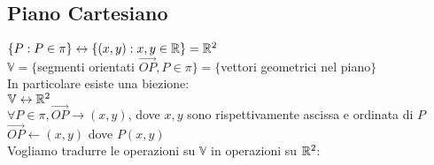 \documentclass{article}
\begin{document}
\subsection*{Piano Cartesiano}
\par$\{P:P\in\pi\}\leftrightarrow\{(x,y):x,y\in\mathbb{R}\}=\mathbb{R}^2$\\
$\mathbb{V}=\{$segmenti orientati $\vec{OP},P\in\pi\}=\{$vettori geometrici nel piano$\}$\\
In particolare esiste una biezione:\\
$\mathbb{V}\leftrightarrow\mathbb{R}^2$\\
$\forall P\in\pi,\vec{OP}\rightarrow(x,y)$, dove $x,y$ sono rispettivamente ascissa e ordinata di $P$\\
$\vec{OP}\leftarrow(x,y)$ dove $P(x,y)$\\
Vogliamo tradurre le operazioni su $\mathbb{V}$ in operazioni su $\mathbb{R}^2$:
\end{document}
